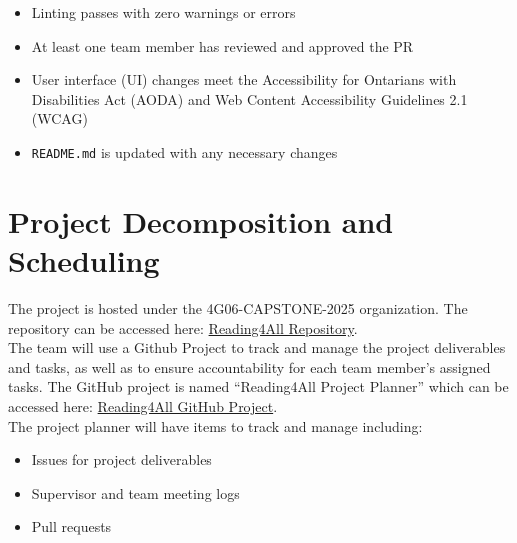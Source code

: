 \documentclass{article}
\begin{document}
\begin{itemize}
\begin{itemize}
\begin{itemize}
        \item $\geq$ 70\% for UI functionality
        \item Overall project coverage target: 80--85\%
    \end{itemize}
    These thresholds align with industry recommendations (75--80\% typical, 90\% exemplary) while ensuring that the most critical system components maintain higher test quality.
    \item Linting passes with zero warnings or errors
    \item At least one team member has reviewed and approved the PR
    \item User interface (UI) changes meet the Accessibility for Ontarians with Disabilities Act (AODA) and Web Content Accessibility Guidelines 2.1 (WCAG)
    \item \texttt{README.md} is updated with any necessary changes
  \end{itemize}
  
  \end{itemize}

\section{Project Decomposition and Scheduling}

The project is hosted under the 4G06-CAPSTONE-2025 organization. The repository can be 
accessed here: \href{https://github.com/4G06-CAPSTONE-2025/Reading4All}{Reading4All Repository}. \\[1ex]
The team will use a Github Project to track and manage the project deliverables and tasks, as well 
as to ensure accountability for each team member's assigned tasks. The GitHub 
project is named ``Reading4All Project Planner'' which can be accessed here: 
\href{https://github.com/orgs/4G06-CAPSTONE-2025/projects/4}{Reading4All GitHub Project}. \\[1ex]
The project planner will have items to track and manage including:
\begin{itemize}
  \item Issues for project deliverables
  \item Supervisor and team meeting logs 
  \item Pull requests 
\end{itemize}
\end{document}
